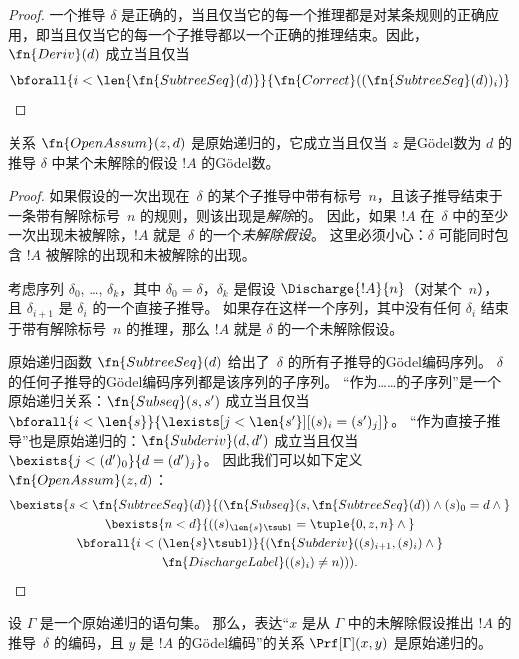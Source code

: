 \documentclass[../../../include/open-logic-section]{subfiles}
\begin{document}
\begin{proof}
  一个推导 $\delta$ 是正确的，当且仅当它的每一个推理都是对某条规则的正确应用，即当且仅当它的每一个子推导都以一个正确的推理结束。因此，$\fn{Deriv}(d)$ 成立当且仅当
  \[
  \bforall{i<\len{\fn{SubtreeSeq}(d)}}{\fn{Correct}((\fn{SubtreeSeq}(d))_i)}
  \]
\end{proof}

\begin{prop}
   关系 $\fn{OpenAssum}(z, d)$ 是原始递归的，它成立当且仅当 $z$ 是Gödel数为 $d$ 的推导 $\delta$ 中某个未解除的假设 $!A$ 的Gödel数。
\end{prop}

\begin{proof}
  如果假设的一次出现在~$\delta$ 的某个子推导中带有标号~$n$，且该子推导结束于一条带有解除标号~$n$ 的规则，则该出现是\emph{解除}的。
  因此，如果 $!A$ 在~$\delta$ 中的至少一次出现未被解除，$!A$ 就是~$\delta$ 的一个\emph{未解除假设}。
  这里必须小心：$\delta$ 可能同时包含 $!A$ 被解除的出现和未被解除的出现。

  考虑序列 $\delta_0$, \dots, $\delta_k$，其中 $\delta_0 = \delta$，$\delta_k$ 是假设 $\Discharge{!A}{n}$（对某个~$n$），且 $\delta_{i+1}$ 是 $\delta_i$ 的一个直接子推导。
  如果存在这样一个序列，其中没有任何 $\delta_i$ 结束于带有解除标号~$n$ 的推理，那么 $!A$ 就是 $\delta$ 的一个未解除假设。

  原始递归函数 $\fn{SubtreeSeq}(d)$ 给出了~$\delta$ 的所有子推导的Gödel编码序列。
  $\delta$ 的任何子推导的Gödel编码序列都是该序列的子序列。
  “作为……的子序列”是一个原始递归关系：$\fn{Subseq}(s, s')$ 成立当且仅当
  $\bforall{i<\len{s}}{\lexists[j<\len{s'}][(s)_i = (s')_j]}$。
  “作为直接子推导”也是原始递归的：$\fn{Subderiv}(d, d')$ 成立当且仅当
  $\bexists{j<(d')_0}{d = (d')_j}$。
  因此我们可以如下定义 $\fn{OpenAssum}(z, d)$：
  \begin{multline*}
    \bexists{s<\fn{SubtreeSeq}(d)}{(\fn{Subseq}(s, \fn{SubtreeSeq}(d))
      \land (s)_0 = d \land {}} \\
    \bexists{n<d}{((s)_{\len{s} \tsub 1} = \tuple{0, z, n} \land {}}\\
      \bforall{i<(\len{s} \tsub 1)}{(\fn{Subderiv}((s)_{i+1}, (s)_i) \land {}}\\
      \fn{DischargeLabel}((s)_i) \neq n))).
  \end{multline*}
\end{proof}

\begin{prop}
  设 $\Gamma$ 是一个原始递归的语句集。
  那么，表达“$x$ 是从 $\Gamma$ 中的未解除假设推出 $!A$ 的推导~$\delta$ 的编码，且 $y$ 是 $!A$ 的Gödel编码”的关系 $\Prf[\Gamma](x, y)$ 是原始递归的。
\end{prop}
\end{document}
